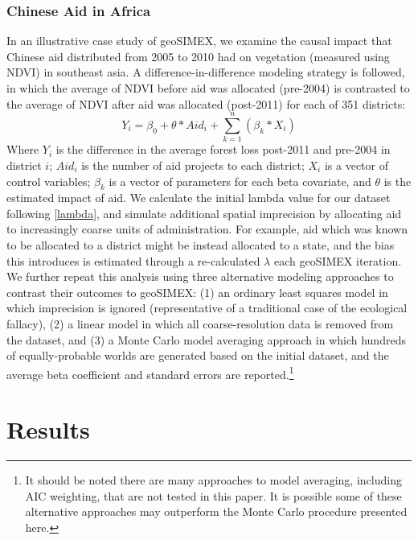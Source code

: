 \subsubsection{Chinese Aid in Africa}
In an illustrative case study of geoSIMEX, we examine the causal impact that Chinese aid distributed from 2005 to 2010 had on vegetation (measured using NDVI) in southeast asia.  
A difference-in-difference modeling strategy is followed, in which the average of NDVI before aid was allocated (pre-2004) is contrasted to the average of NDVI after aid was allocated (post-2011) for each of 351 districts:
\begin{equation}\label{eq:caseStudy}
Y_{i} = \beta_0 + \theta * Aid_{i} + \sum_{k=1}^{n}(\beta_{k} * X_{i})
\end{equation}
Where $Y_{i}$ is the difference in the average forest loss post-2011 and pre-2004 in district $i$; $Aid_{i}$ is the number of aid projects to each district; $X_{i}$ is a vector of control variables; $\beta_{k}$ is a vector of parameters for each beta covariate, and $\theta$ is the estimated impact of aid.
We calculate the initial lambda value for our dataset following \ref{lambda}, and simulate additional spatial imprecision by allocating aid to increasingly coarse units of administration.  
For example, aid which was known to be allocated to a district might be instead allocated to a state, and the bias this introduces is estimated through a re-calculated $\lambda$ each geoSIMEX iteration.
We further repeat this analysis using three alternative modeling approaches to contrast their outcomes to geoSIMEX: (1) an ordinary least squares model in which imprecision is ignored (representative of a traditional case of the ecological fallacy), (2) a linear model in which all coarse-resolution data is removed from the dataset, and (3) a Monte Carlo model averaging approach in which hundreds of equally-probable worlds are generated based on the initial dataset, and the average beta coefficient and standard errors are reported.\footnote{It should be noted there are many approaches to model averaging, including AIC weighting, that are not tested in this paper. It is possible some of these alternative approaches may outperform the Monte Carlo procedure presented here.}











\newpage

\section{Results}
